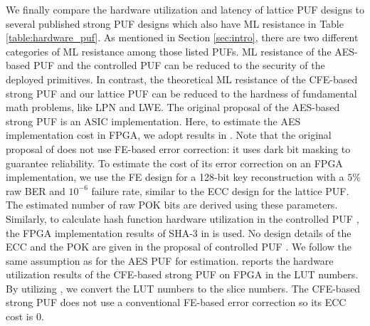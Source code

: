 We finally compare the hardware utilization and latency of lattice PUF designs to several published strong PUF designs \cite{bhargava2014efficient, gassend2008controlled, jin2017fpga} which also have ML resistance in Table \ref{table:hardware_puf}. 
As mentioned in Section \ref{sec:intro}, there are two different categories of ML resistance among those listed PUFs. 
ML resistance of the AES-based PUF and the controlled PUF can be reduced to the security of the deployed primitives. 
In contrast, the theoretical ML resistance of the CFE-based strong PUF and our lattice PUF can be reduced to the hardness of fundamental math problems, like LPN and LWE.
The original proposal of the AES-based strong PUF \cite{bhargava2014efficient} is an ASIC implementation. 
Here, to estimate the AES implementation cost in FPGA, we adopt results in \cite{chu2012low}.
Note that the original proposal of \cite{bhargava2014efficient} does not use FE-based error correction: it uses dark bit masking to guarantee reliability. 
To estimate the cost of its error correction on an FPGA implementation, we use the FE design for a 128-bit key reconstruction with a $5\%$ raw BER and $10^{-6}$ failure rate, similar to the ECC design for the lattice PUF. The estimated number of raw POK bits are derived using these parameters.
Similarly, to calculate hash function hardware utilization in the controlled PUF \cite{gassend2008controlled}, the FPGA implementation results of SHA-3 in \cite{sha3_finalist} is used. 
No design details of the ECC and the POK are given in the proposal of controlled PUF \cite{gassend2008controlled}. 
We follow the same assumption as for the AES PUF for estimation.
\cite{jin2017fpga} reports the hardware utilization results of the CFE-based strong PUF on FPGA in the LUT numbers.
By utilizing \cite{xilinx:ds190}, we convert the LUT numbers to the slice numbers. 
The CFE-based strong PUF does not use a conventional FE-based error correction so its ECC cost is 0.

